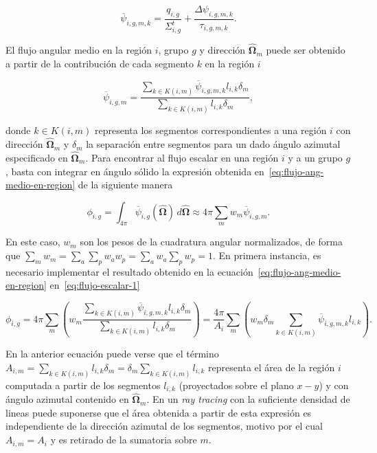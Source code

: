 \documentclass[11pt]{article}
\numberwithin{equation}{section}
\begin{document}
\begin{equation} \label{eq:flujo-ang-medio-en-segmento}
 \overline{\psi}_{i,g,m,k} = \frac{q_{i,g}}{\Sigma^t_{i,g}} + \frac{\Delta \psi_{i,g,m,k}}{\tau_{i,g,m,k}}.
\end{equation}

El flujo angular medio en la región $i$, grupo $g$ y dirección $\boldsymbol{\hat{\Omega}}_m$ puede ser obtenido a partir de la contribuci\'on de cada segmento $k$ en la región $i$

\begin{equation} \label{eq:flujo-ang-medio-en-region}
 \overline{\psi}_{i,g,m} = \frac{\sum_{k \in K(i,m)} \overline{\psi}_{i,g,m,k} l_{i,k} \delta_m}{\sum_{k \in K(i,m)} l_{i,k} \delta_m},
\end{equation}

\noindent
donde $k \in K(i,m)$ representa los segmentos correspondientes a una región $i$ con dirección $\boldsymbol{\hat{\Omega}}_m$ y $\delta_m$ la separaci\'on entre segmentos para un dado ángulo azimutal especificado en $\boldsymbol{\hat{\Omega}}_m$. Para encontrar al flujo escalar en una región $i$ y a un grupo $g$, basta con integrar en ángulo s\'olido la expresi\'on obtenida en~\eqref{eq:flujo-ang-medio-en-region} de la siguiente manera

\begin{equation} \label{eq:flujo-escalar-1}
 \phi_{i,g} = \int_{4\pi} \overline{\psi}_{i,g} (\boldsymbol{\hat{\Omega}}) \, d\boldsymbol{\hat{\Omega}} \approx 
 4\pi \sum_m w_m \overline{\psi}_{i,g,m}.
\end{equation}

\noindent
En este caso, $w_m$ son los pesos de la cuadratura angular normalizados, de forma que $\sum_m w_m = \sum_a \sum_p w_a w_p = \sum_a w_a \sum_p w_p = 1$. En primera instancia, es necesario implementar el resultado obtenido en la ecuación~\eqref{eq:flujo-ang-medio-en-region} en~\eqref{eq:flujo-escalar-1}

\begin{equation} \label{eq:flujo-escalar-2}
 \phi_{i,g} =
 4\pi \sum_m \left( w_m \frac{\sum_{k \in K(i,m)} \overline{\psi}_{i,g,m,k} l_{i,k} \delta_m}{\sum_{k \in K(i,m)} l_{i,k} \delta_m} \right) = 
 \frac{4\pi}{A_i} \sum_m \left( w_m \delta_m \sum_{k \in K(i,m)} \overline{\psi}_{i,g,m,k} l_{i,k} \right).
\end{equation}

\noindent
En la anterior ecuación puede verse que el t\'ermino $A_{i,m} = \sum_{k \in K(i,m)} l_{i,k} \delta_m = \delta_m \sum_{k \in K(i,m)} l_{i,k}$ representa el área de la región $i$ computada a partir de los segmentos $l_{i,k}$ (proyectados sobre el plano $x - y$) y con ángulo azimutal contenido en $\boldsymbol{\hat{\Omega}}_m$. En un \emph{ray tracing} con la suficiente densidad de lineas puede suponerse que el área obtenida a partir de esta expresi\'on es independiente de la dirección azimutal de los segmentos, motivo por el cual $A_{i,m} = A_i$ y es retirado de la sumatoria sobre $m$.
\end{document}
